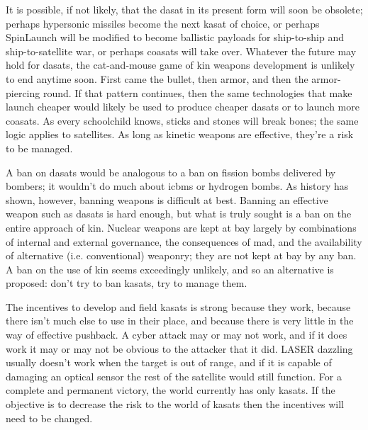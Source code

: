 It is possible, if not likely, that the \ac{dasat} in its present form
will soon be obsolete; perhaps hypersonic missiles become the next
\ac{kasat} of choice, or perhaps SpinLaunch will be modified to become
ballistic payloads for ship-to-ship and ship-to-satellite war, or
perhaps \acp{coasat} will take over.  Whatever the future may hold for
\acp{dasat}, the cat-and-mouse game of \ac{kin} weapons development is
unlikely to end anytime soon.  First came the bullet, then armor, and
then the armor-piercing round.  If that pattern continues, then the
same technologies that make launch cheaper would likely be used to
produce cheaper \acp{dasat} or to launch more \acp{coasat}.  As every
schoolchild knows, sticks and stones will break bones; the same logic
applies to satellites.  As long as kinetic weapons are effective,
they're a risk to be managed.

A ban on \aclp{dasat} would be analogous to a ban on fission bombs
delivered by bombers; it wouldn't do much about \acp{icbm} or hydrogen
bombs.  As history has shown, however, banning weapons is difficult at
best.  Banning an effective weapon such as \acp{dasat} is hard enough,
but what is truly sought is a ban on the entire approach of \ac{kin}.
Nuclear weapons are kept at bay largely by combinations of internal
and external governance, the consequences of \ac{mad}, and the
availability of alternative (i.e. conventional) weaponry; they are not
kept at bay by any ban.  A ban on the use of \ac{kin} seems
exceedingly unlikely, and so an alternative is proposed: don't try to
ban \acp{kasat}, try to manage them.

The incentives to develop and field \acp{kasat} is strong because they
work, because there isn't much else to use in their place, and because
there is very little in the way of effective pushback.  A cyber attack
may or may not work, and if it does work it may or may not be obvious
to the attacker that it did.  LASER dazzling usually doesn't work when
the target is out of range, and if it is capable of damaging an
optical sensor the rest of the satellite would still function.  For a
complete and permanent victory, the world currently has only
\acp{kasat}.  If the objective is to decrease the risk to the world of
\acp{kasat} then the incentives will need to be changed.
